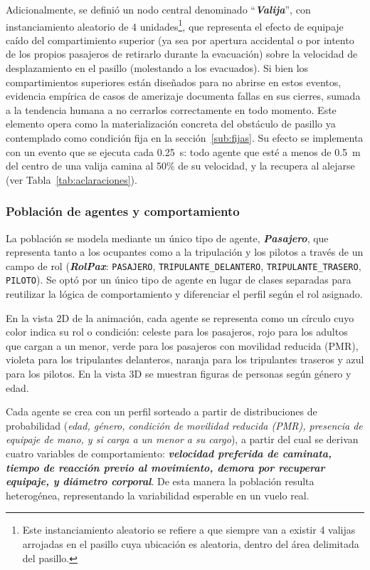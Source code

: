 \documentclass[a4paper, 11pt]{article}
\begin{document}
Adicionalmente, se defini\'o un nodo central denominado
``\textbf{\textit{Valija}}'', con instanciamiento aleatorio de 4
unidades\footnote{Este instanciamiento aleatorio se refiere a que siempre van a
existir 4 valijas arrojadas en el pasillo cuya ubicaci\'on es aleatoria, dentro del
\'area delimitada del pasillo.}, que representa el efecto de equipaje ca\'ido del
compartimiento superior (ya sea por apertura accidental o por intento de los propios
pasajeros de retirarlo durante la evacuaci\'on) sobre la velocidad de
desplazamiento en el pasillo (molestando a los evacuados). Si bien los
compartimientos superiores est\'an dise\~nados para no abrirse en estos eventos,
evidencia emp\'irica de casos de amerizaje documenta fallas en sus cierres, sumada a
la tendencia humana a no cerrarlos correctamente en todo momento. Este elemento
opera como la materializaci\'on concreta del obst\'aculo de pasillo ya contemplado
como condici\'on fija en la secci\'on~\ref{sub:fijas}. Su efecto se implementa con
un evento que se ejecuta cada 0.25~s: todo agente que est\'e a menos de 0.5~m del
centro de una valija camina al 50\% de su velocidad, y la recupera al alejarse
(ver Tabla~\ref{tab:aclaraciones}).

\subsubsection{Poblaci\'on de agentes y comportamiento}\label{sub:poblacion}

La poblaci\'on se modela mediante un \'unico tipo de agente,
\textbf{\textit{Pasajero}}, que representa tanto a los ocupantes como a la
tripulaci\'on y los pilotos a trav\'es de un campo de rol
(\textbf{\textit{RolPax}}: \texttt{PASAJERO}, \texttt{TRIPULANTE\_DELANTERO},
\texttt{TRIPULANTE\_TRASERO}, \texttt{PILOTO}). Se opt\'o por un \'unico tipo de
agente en lugar de clases separadas para reutilizar la l\'ogica de comportamiento y
diferenciar el perfil seg\'un el rol asignado.

En la vista 2D de la animaci\'on, cada agente se representa como un c\'irculo cuyo
color indica su rol o condici\'on: celeste para los pasajeros, rojo para los adultos
que cargan a un menor, verde para los pasajeros con movilidad reducida (PMR),
violeta para los tripulantes delanteros, naranja para los tripulantes traseros y
azul para los pilotos. En la vista 3D se muestran figuras de personas seg\'un
g\'enero y edad.

Cada agente se crea con un perfil sorteado a partir de distribuciones de
probabilidad (\textit{edad, g\'enero, condici\'on de movilidad reducida (PMR),
presencia de equipaje de mano, y si carga a un menor a su cargo}), a partir del cual
se derivan cuatro variables de comportamiento: \textbf{\textit{velocidad preferida
de caminata, tiempo de reacci\'on previo al movimiento, demora por recuperar
equipaje, y di\'ametro corporal}}. De esta manera la poblaci\'on resulta
heterog\'enea, representando la variabilidad esperable en un vuelo real.
\end{document}
